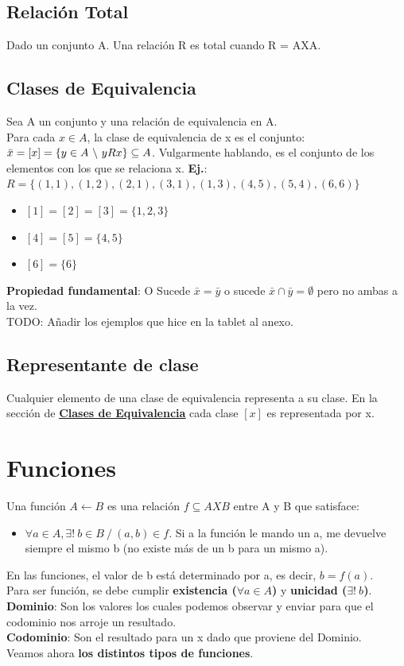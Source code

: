 \documentclass[10pt,a4paper]{article}
\begin{document}
\subsection*{Relación Total}
Dado un conjunto A. Una relación R es total cuando R = AXA.
\subsection*{Clases de Equivalencia}
\label{subsec:clases_equivalencia}
Sea A un conjunto y una relación de equivalencia en A. \\
Para cada $x \in A$, la clase de equivalencia de x es el conjunto: $\bar{x} = [x] = \{y \in A \ \symbol{92} \ yRx\} \subseteq A$. Vulgarmente hablando, es el conjunto de los elementos con los que se relaciona x.
\textbf{Ej.}: $ R = \{(1,1), (1, 2), (2, 1), (3, 1), (1, 3), (4, 5), (5, 4), (6, 6)\}$
\begin{itemize}
    \item $[1] = [2] = [3] =  \{1, 2, 3\}$
    \item $[4] = [5] = \{4, 5\}$
    \item $[6] = \{6\}$
\end{itemize}
\textbf{Propiedad fundamental}: O Sucede $ \bar{x} = \bar{y}$ o sucede $\bar{x} \cap \bar{y} = \emptyset $ pero no ambas a la vez. \\
TODO: Añadir los ejemplos que hice en la tablet al anexo.
\subsection*{Representante de clase}
Cualquier elemento de una clase de equivalencia representa a su clase. 
En la sección de \hyperref[subsec:clases_equivalencia]{\underline{\textbf{Clases de Equivalencia}}} cada clase $[x]$ es representada por x. \\
\section*{Funciones}
Una función $A \leftarrow B$ es una relación $ f \subseteq AXB$ entre A y B que satisface: 
\begin{itemize}
    \item $\forall a \in A, \exists! \ b \in B \ / \ (a, b) \in f$. Si a la función le mando un a, me devuelve siempre el mismo b (no existe más de un b para un mismo a).
\end{itemize}
En las funciones, el valor de b está determinado por a, es decir, $b = f(a)$. \\
Para ser función, se debe cumplir \textbf{existencia ($\forall a \in A$)} y \textbf{unicidad ($\exists! \ b $)}. \\
\textbf{Dominio}: Son los valores los cuales podemos observar y enviar para que el codominio nos arroje un resultado. \\
\textbf{Codominio}: Son el resultado para un x dado que proviene del Dominio. \\
Veamos ahora \textbf{los distintos tipos de funciones}.
\end{document}
